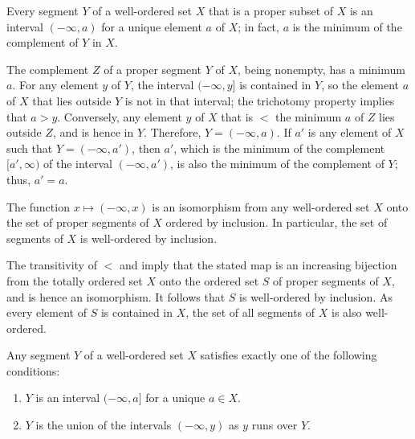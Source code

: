 \documentclass{article}
\begin{document}
\begin{theorem}
  \label{thm:htdzbbwv}
  Every segment \(Y\) of a well-ordered set \(X\) that is a proper
  subset of \(X\) is an interval \((-\infty, a)\) for a unique element
  \(a\) of \(X\); in fact, \(a\) is the minimum of the complement of
  \(Y\) in \(X\).
\end{theorem}

The complement \(Z\) of a proper segment \(Y\) of \(X\), being
nonempty, has a minimum \(a\).  For any element \(y\) of \(Y\), the
interval \((-\infty,y]\) is contained in \(Y\), so the element \(a\)
of \(X\) that lies outside \(Y\) is not in that interval; the
trichotomy property implies that \(a > y\).  Conversely, any element
\(y\) of \(X\) that is \(<\) the minimum \(a\) of \(Z\) lies outside
\(Z\), and is hence in \(Y\).  Therefore, \(Y = (-\infty,a)\).  If
\(a'\) is any element of \(X\) such that \(Y = (-\infty, a')\), then
\(a'\), which is the minimum of the complement \([a', \infty)\) of the
interval \((-\infty, a')\), is also the minimum of the complement of
\(Y\); thus, \(a' = a\).

\begin{theorem}
  \label{thm:b4yv5x3a}
  The function \(x \mapsto (-\infty, x)\) is an isomorphism from any
  well-ordered set \(X\) onto the set of proper segments of \(X\)
  ordered by inclusion.  In particular, the set of segments of \(X\)
  is well-ordered by inclusion.
\end{theorem}

The transitivity of \(<\) and  imply that the
stated map is an increasing bijection from the totally ordered set
\(X\) onto the ordered set \(S\) of proper segments of \(X\), and is
hence an isomorphism.  It follows that \(S\) is well-ordered by
inclusion.  As every element of \(S\) is contained in \(X\), the set
of all segments of \(X\) is also well-ordered.

\begin{theorem}
  \label{thm:36vndfrs}
  Any segment \(Y\) of a well-ordered set \(X\) satisfies exactly one
  of the following conditions:
  \begin{enumerate}
  \item \(Y\) is an interval \((-\infty, a]\) for a unique
    \(a \in X\).
  \item \(Y\) is the union of the intervals \((-\infty, y)\) as \(y\)
    runs over \(Y\).
  \end{enumerate}
\end{theorem}
\end{document}
